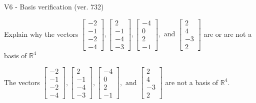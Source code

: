 \begin{exercise}
  \begin{exerciseTitle}V6 - Basis verification (ver. 732)\end{exerciseTitle}
  \begin{exerciseStatement}
    Explain why the vectors \(\left[\begin{array}{r}
-2 \\
-1 \\
-2 \\
-4
\end{array}\right] , \left[\begin{array}{r}
2 \\
-1 \\
-4 \\
-3
\end{array}\right] , \left[\begin{array}{r}
-4 \\
0 \\
2 \\
-1
\end{array}\right] , \text{ and } \left[\begin{array}{r}
2 \\
4 \\
-3 \\
2
\end{array}\right]\) are or are not a basis of \(\mathbb{R}^4\)	


  \end{exerciseStatement}
  \begin{exerciseAnswer}
   The vectors \(\left[\begin{array}{r}
-2 \\
-1 \\
-2 \\
-4
\end{array}\right] , \left[\begin{array}{r}
2 \\
-1 \\
-4 \\
-3
\end{array}\right] , \left[\begin{array}{r}
-4 \\
0 \\
2 \\
-1
\end{array}\right] , \text{ and } \left[\begin{array}{r}
2 \\
4 \\
-3 \\
2
\end{array}\right]\) 
  	 are not  a basis of \(\mathbb{R}^4\).
  


  \end{exerciseAnswer}
\end{exercise}
